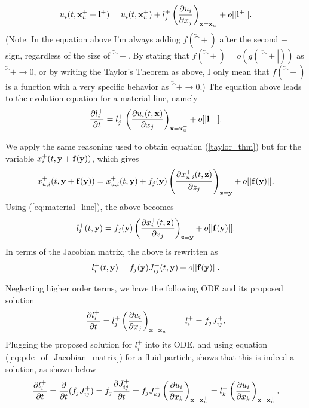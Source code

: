 \documentclass[oneside,a4paper,11pt]{report}
\begin{document}
\begin{equation}
\label{taylor_thm}
u_i(t,\mathbf{x}^+_u + \mathbf{l}^+) = u_i(t,\mathbf{x}^+_u) + l_j^+\left ( \frac{\partial u_i}{\partial x_j} \right )_{\mathbf{x} = \mathbf{x}^+_u} +o[|\mathbf{l}^+|].
\end{equation} 
(Note: In the equation above I'm always adding $f(\lvec^+)$ after the second $+$ sign, regardless of the size of $\lvec^+$. By stating that $f(\lvec^+) = o(g(|\lvec^+|))$ as $\lvec^+ \to 0$, or by writing the Taylor's Theorem as above, I only mean that $f(\lvec^+)$ is a function with a very specific behavior as $\lvec^+ \to 0$.)
The equation above leads to the evolution equation for a material line, namely
\begin{equation}
\frac{\partial l_i^+}{\partial t} = l_j^+ \left ( \frac{\partial u_i(t,\mathbf{x})}{\partial x_j} \right )_{\mathbf{x} = \mathbf{x}^+_u} + o[|\mathbf{l}^+|].
\end{equation}

We apply the same reasoning used to obtain equation (\ref{taylor_thm}) but for the variable $x_i^+(t,\mathbf{y} + \mathbf{f}(\mathbf{y}))$, which gives
\begin{equation}
    x_{u,i}^+(t,\mathbf{y} + \mathbf{f}(\mathbf{y})) = x_{u,i}^+(t,\mathbf{y}) + f_j (\mathbf{y}) \left ( \frac{\partial x_{u,i}^+(t,\mathbf{z}) }{\partial z_j} \right)_{\mathbf{z} = \mathbf{y}} + o[|\mathbf{f}(\mathbf{y})|].
\end{equation}
Using (\cref{eq:material_line}), the above becomes
\begin{equation}
l^+_i(t,\mathbf{y}) = f_j(\mathbf{y}) \left ( \frac{\partial x_i^+(t,\mathbf{z})}{\partial z_j} \right )_{\mathbf{z} = \mathbf{y}} + o[|\mathbf{f}( \mathbf{y})|].
\end{equation}
In terms of the Jacobian matrix, the above is rewritten as
\begin{equation}
l^+_i(t,\mathbf{y}) = f_j(\mathbf{y})J^+_{ij}(t,\mathbf{y}) + o[|\mathbf{f}( \mathbf{y})|].
\end{equation}

Neglecting higher order terms, we have the following ODE and its proposed solution
\begin{equation}
\label{eq:material_line_eqs}
\frac{\partial l_i^+}{\partial t} = l_j^+ \left ( \frac{\partial u_i}{\partial x_j} \right )_{\mathbf{x} = \mathbf{x}^+_u} \qquad l^+_i = f_j J^+_{ij}.
\end{equation}
Plugging the proposed solution for $l_i^+$ into its ODE, and using equation (\ref{eq:pde_of_Jacobian_matrix}) for a fluid particle, shows that this is indeed a solution, as shown below
\begin{equation}
\frac{\partial l_i^+}{\partial t} = \frac{\partial}{\partial t}  ( f_j J^+_{ij} ) 
= f_j \frac{\partial J^+_{ij}}{\partial t}
= f_j J^+_{kj} \left ( \frac{\partial u_i}{\partial x_k} \right )_{\mathbf{x}=\mathbf{x}^+_u} 
= l_k^+ \left ( \frac{\partial u_i}{\partial x_k} \right )_{\mathbf{x} = \mathbf{x}^+_u}.
\end{equation}
\end{document}
